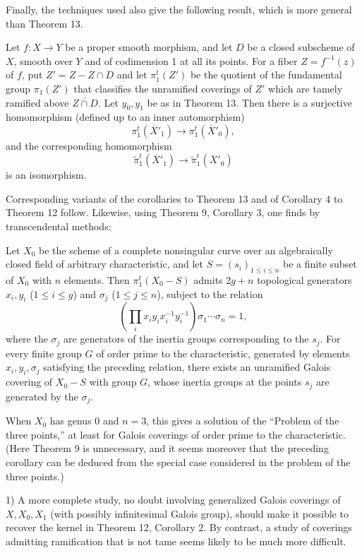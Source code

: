 Finally, the techniques used also give the following result, which is more
general than Theorem 13.

 Let $f:X\longrightarrow Y$ be a proper smooth morphism,
and let $D$ be a closed subscheme of $X$, smooth over $Y$ and of codimension 1
at all its points. For a fiber $Z=f^{-1}(z)$ of $f$, put $Z'=Z-Z\cap D$ and
let $\pi_1^t(Z')$ be the quotient of the fundamental group $\pi_1(Z')$ that
classifies the unramified coverings of $Z'$ which are tamely ramified above
$\overline{Z\cap D}$. Let $y_0,y_1$ be as in Theorem 13. Then there is a
surjective homomorphism (defined up to an inner automorphism)
\[
  \pi_1^t(\overline X'_1)\longrightarrow\pi_1^t(\overline X'_0),
\]
and the corresponding homomorphism
\[
  \widetilde\pi_1^t(\overline X'_1)
  \longrightarrow\widetilde\pi_1^t(\overline X'_0)
\]
is an isomorphism.

Corresponding variants of the corollaries to Theorem 13 and of Corollary 4 to
Theorem 12 follow. Likewise, using Theorem 9, Corollary 3, one finds by
transcendental methods:

 Let $X_0$ be the scheme of a complete nonsingular curve
over an algebraically closed field of arbitrary characteristic, and let
$S=(s_i)_{1\le i\le n}$ be a finite subset of $X_0$ with $n$ elements. Then
$\pi_1^t(X_0-S)$ admits $2g+n$ topological generators
$x_i,y_i$ ($1\le i\le g$) and $\sigma_j$ ($1\le j\le n$), subject to the
relation
\[
  \left(\prod_i x_i y_i x_i^{-1}y_i^{-1}\right)
  \sigma_1\cdots\sigma_n=1,
\]
where the $\sigma_j$ are generators of the inertia groups corresponding to the
$s_j$. For every finite group $G$ of order prime to the characteristic,
generated by elements $x_i,y_i,\sigma_j$ satisfying the preceding relation,
there exists an unramified Galois covering of $X_0-S$ with group $G$, whose
inertia groups at the points $s_j$ are generated by the $\sigma_j$.

When $X_0$ has genus 0 and $n=3$, this gives a solution of the “Problem
of the three points,” at least for Galois coverings of order prime to the
characteristic. (Here Theorem 9 is unnecessary, and it seems moreover that the
preceding corollary can be deduced from the special case considered in the
problem of the three points.)


1) A more complete study, no doubt involving generalized Galois coverings of
$X,X_0,X_1$ (with possibly infinitesimal Galois group), should make it possible
to recover the kernel in Theorem 12, Corollary 2. By contrast, a study of
coverings admitting ramification that is not tame seems likely to be much more
difficult.

